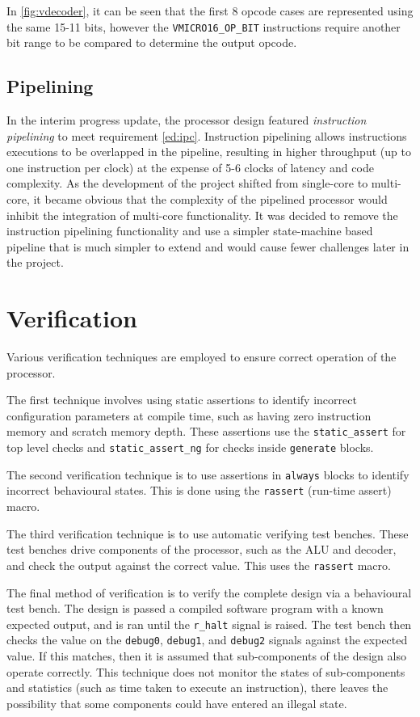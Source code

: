 In \cref{fig:vdecoder}, it can be seen that the first 8 opcode cases are represented using the same 15-11 bits, however the \verb|VMICRO16_OP_BIT| instructions require another bit range to be compared to determine the output opcode.



\subsection{Pipelining}
In the interim progress update, the processor design featured \textit{instruction pipelining} to meet requirement \ref{ed:ipc}. Instruction pipelining allows instructions executions to be overlapped in the pipeline, resulting in higher throughput (up to one instruction per clock) at the expense of 5-6 clocks of latency and code complexity. As the development of the project shifted from single-core to multi-core, it became obvious that the complexity of the pipelined processor would inhibit the integration of multi-core functionality. It was decided to remove the instruction pipelining functionality and use a simpler state-machine based pipeline that is much simpler to extend and would cause fewer challenges later in the project. 


\section{Verification}
Various verification techniques are employed to ensure correct operation of the processor.

The first technique involves using static assertions to identify incorrect configuration parameters at compile time, such as having zero instruction memory and scratch memory depth. These assertions use the \verb|static_assert| for top level checks and \verb|static_assert_ng| for checks inside \verb|generate| blocks.

The second verification technique is to use assertions in \verb|always| blocks to identify incorrect behavioural states. This is done using the \verb|rassert| (run-time assert) macro.

The third verification technique is to use automatic verifying test benches. These test benches drive components of the processor, such as the ALU and decoder, and check the output against the correct value. This uses the \verb|rassert| macro.

The final method of verification is to verify the complete design via a behavioural test bench. The design is passed a compiled software program with a known expected output, and is ran until the \verb|r_halt| signal is raised. The test bench then checks the value on the \verb|debug0|, \verb|debug1|, and \verb|debug2| signals against the expected value. If this matches, then it is assumed that sub-components of the design also operate correctly. This technique does not monitor the states of sub-components and statistics (such as time taken to execute an instruction), there leaves the possibility that some components could have entered an illegal state.



